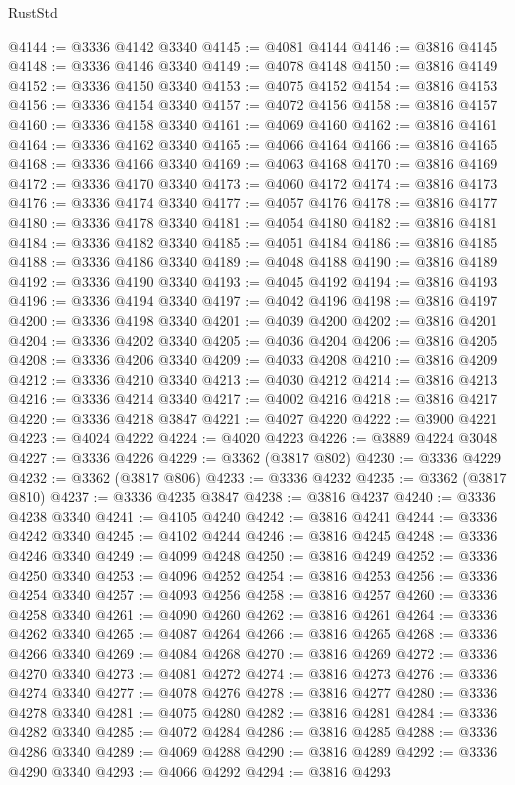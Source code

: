 \begin{lexlean}{RustStd}
\begin{coremodule}
@4144 := @3336 @4142 @3340
@4145 := @4081 @4144
@4146 := @3816 @4145
@4148 := @3336 @4146 @3340
@4149 := @4078 @4148
@4150 := @3816 @4149
@4152 := @3336 @4150 @3340
@4153 := @4075 @4152
@4154 := @3816 @4153
@4156 := @3336 @4154 @3340
@4157 := @4072 @4156
@4158 := @3816 @4157
@4160 := @3336 @4158 @3340
@4161 := @4069 @4160
@4162 := @3816 @4161
@4164 := @3336 @4162 @3340
@4165 := @4066 @4164
@4166 := @3816 @4165
@4168 := @3336 @4166 @3340
@4169 := @4063 @4168
@4170 := @3816 @4169
@4172 := @3336 @4170 @3340
@4173 := @4060 @4172
@4174 := @3816 @4173
@4176 := @3336 @4174 @3340
@4177 := @4057 @4176
@4178 := @3816 @4177
@4180 := @3336 @4178 @3340
@4181 := @4054 @4180
@4182 := @3816 @4181
@4184 := @3336 @4182 @3340
@4185 := @4051 @4184
@4186 := @3816 @4185
@4188 := @3336 @4186 @3340
@4189 := @4048 @4188
@4190 := @3816 @4189
@4192 := @3336 @4190 @3340
@4193 := @4045 @4192
@4194 := @3816 @4193
@4196 := @3336 @4194 @3340
@4197 := @4042 @4196
@4198 := @3816 @4197
@4200 := @3336 @4198 @3340
@4201 := @4039 @4200
@4202 := @3816 @4201
@4204 := @3336 @4202 @3340
@4205 := @4036 @4204
@4206 := @3816 @4205
@4208 := @3336 @4206 @3340
@4209 := @4033 @4208
@4210 := @3816 @4209
@4212 := @3336 @4210 @3340
@4213 := @4030 @4212
@4214 := @3816 @4213
@4216 := @3336 @4214 @3340
@4217 := @4002 @4216
@4218 := @3816 @4217
@4220 := @3336 @4218 @3847
@4221 := @4027 @4220
@4222 := @3900 @4221
@4223 := @4024 @4222
@4224 := @4020 @4223
@4226 := @3889 @4224 @3048
@4227 := @3336 @4226
@4229 := @3362 (@3817 @802)
@4230 := @3336 @4229
@4232 := @3362 (@3817 @806)
@4233 := @3336 @4232
@4235 := @3362 (@3817 @810)
@4237 := @3336 @4235 @3847
@4238 := @3816 @4237
@4240 := @3336 @4238 @3340
@4241 := @4105 @4240
@4242 := @3816 @4241
@4244 := @3336 @4242 @3340
@4245 := @4102 @4244
@4246 := @3816 @4245
@4248 := @3336 @4246 @3340
@4249 := @4099 @4248
@4250 := @3816 @4249
@4252 := @3336 @4250 @3340
@4253 := @4096 @4252
@4254 := @3816 @4253
@4256 := @3336 @4254 @3340
@4257 := @4093 @4256
@4258 := @3816 @4257
@4260 := @3336 @4258 @3340
@4261 := @4090 @4260
@4262 := @3816 @4261
@4264 := @3336 @4262 @3340
@4265 := @4087 @4264
@4266 := @3816 @4265
@4268 := @3336 @4266 @3340
@4269 := @4084 @4268
@4270 := @3816 @4269
@4272 := @3336 @4270 @3340
@4273 := @4081 @4272
@4274 := @3816 @4273
@4276 := @3336 @4274 @3340
@4277 := @4078 @4276
@4278 := @3816 @4277
@4280 := @3336 @4278 @3340
@4281 := @4075 @4280
@4282 := @3816 @4281
@4284 := @3336 @4282 @3340
@4285 := @4072 @4284
@4286 := @3816 @4285
@4288 := @3336 @4286 @3340
@4289 := @4069 @4288
@4290 := @3816 @4289
@4292 := @3336 @4290 @3340
@4293 := @4066 @4292
@4294 := @3816 @4293

\end{coremodule}
\end{lexlean}
